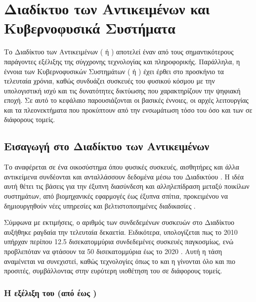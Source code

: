 
\chapter{Διαδίκτυο των Αντικειμένων και Κυβερνοφυσικά Συστήματα}\label{ch:iot}

Το Διαδίκτυο των Αντικειμένων ( ή ) αποτελεί έναν από τους σημαντικότερους παράγοντες εξέλιξης της σύγχρονης τεχνολογίας και πληροφορικής. Παράλληλα, η έννοια των Κυβερνοφυσικών Συστημάτων ( ή ) έχει έρθει στο προσκήνιο τα τελευταία χρόνια, καθώς συνδυάζει συσκευές του φυσικού κόσμου με την υπολογιστική ισχύ και τις δυνατότητες δικτύωσης που χαρακτηρίζουν την ψηφιακή εποχή. Σε αυτό το κεφάλαιο παρουσιάζονται οι βασικές έννοιες, οι αρχές λειτουργίας και τα πλεονεκτήματα που προκύπτουν από την ενσωμάτωση τόσο του  όσο και των  σε διάφορους τομείς.

\section{Εισαγωγή στο Διαδίκτυο των Αντικειμένων}

Το  αναφέρεται σε ένα οικοσύστημα όπου φυσικές συσκευές,
αισθητήρες και άλλα αντικείμενα συνδέονται και ανταλλάσσουν δεδομένα μέσω του Διαδικτύου
\cite{gubbi_internet_2013}. Η ιδέα αυτή θέτει τις βάσεις για την έξυπνη διασύνδεση και
αλληλεπίδραση μεταξύ ποικίλων συστημάτων, από βιομηχανικές εφαρμογές έως έξυπνα σπίτια,
προκειμένου να δημιουργηθούν νέες υπηρεσίες και βελτιστοποιημένες διαδικασίες
\cite{weber_internet_2010}.

Σύμφωνα με εκτιμήσεις, ο αριθμός των συνδεδεμένων συσκευών στο Διαδίκτυο αυξήθηκε
ραγδαία την τελευταία δεκαετία. Ειδικότερα, υπολογίζεται πως το 2010 υπήρχαν περίπου
12.5 δισεκατομμύρια συνδεδεμένες συσκευές παγκοσμίως, ενώ προβλεπόταν να φτάσουν τα
50 δισεκατομμύρια έως το 2020 \cite{Evans2011}. Αυτή η τάση αναμένεται να συνεχιστεί,
καθώς τεχνολογίες όπως το  και η  γίνονται
όλο και πιο προσιτές, συμβάλλοντας στην ευρύτερη υιοθέτηση του  σε διάφορους τομείς.

\subsection{Η εξέλιξη του  (από  έως )}

